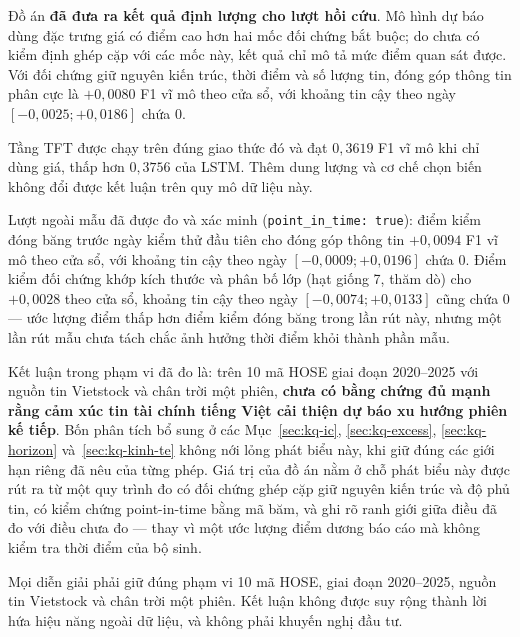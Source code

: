 Đồ án \textbf{đã đưa ra kết quả định lượng cho lượt hồi cứu}. Mô hình dự báo dùng đặc
trưng giá có điểm cao hơn hai mốc đối chứng bắt buộc; do chưa có kiểm định ghép cặp với
các mốc này, kết quả chỉ mô tả mức điểm quan sát được. Với đối chứng giữ nguyên kiến
trúc, thời điểm và số lượng tin, đóng góp thông tin phân cực là $+0{,}0080$ F1
vĩ mô theo cửa sổ, với khoảng tin cậy theo ngày $[-0{,}0025; +0{,}0186]$ chứa 0.

Tầng TFT được chạy trên đúng giao thức đó và đạt $0{,}3619$ F1 vĩ mô khi chỉ dùng giá,
thấp hơn $0{,}3756$ của LSTM. Thêm dung lượng và cơ chế chọn biến không đổi được kết
luận trên quy mô dữ liệu này.

Lượt ngoài mẫu đã được đo và xác minh (\texttt{point\_in\_time: true}): điểm
kiểm đóng băng trước ngày kiểm thử đầu tiên cho đóng góp thông tin $+0{,}0094$
F1 vĩ mô theo cửa sổ, với khoảng tin cậy theo ngày $[-0{,}0009; +0{,}0196]$ chứa
0. Điểm kiểm đối chứng khớp kích thước và phân bố lớp (hạt giống 7, thăm dò)
cho $+0{,}0028$ theo cửa sổ, khoảng tin cậy theo ngày $[-0{,}0074; +0{,}0133]$
cũng chứa 0 --- ước lượng điểm thấp hơn điểm kiểm đóng băng trong lần rút này,
nhưng một lần rút mẫu chưa tách chắc ảnh hưởng thời điểm khỏi thành phần mẫu.

Kết luận trong phạm vi đã đo là: trên 10 mã HOSE giai đoạn 2020--2025 với nguồn tin
Vietstock và chân trời một phiên, \textbf{chưa có bằng chứng đủ mạnh rằng cảm xúc
tin tài chính tiếng Việt cải thiện dự báo xu hướng phiên kế tiếp}. Bốn phân tích
bổ sung ở các Mục~\ref{sec:kq-ic}, \ref{sec:kq-excess}, \ref{sec:kq-horizon}
và~\ref{sec:kq-kinh-te} không nới lỏng phát biểu này, khi giữ đúng các giới hạn
riêng đã nêu của từng phép. Giá trị của đồ án nằm ở chỗ
phát biểu này được rút ra từ một quy trình đo có đối chứng ghép cặp giữ nguyên kiến
trúc và độ phủ tin, có kiểm chứng point-in-time bằng mã băm, và ghi rõ ranh giới
giữa điều đã đo với điều chưa đo --- thay vì một ước lượng điểm dương báo cáo mà
không kiểm tra thời điểm của bộ sinh.

Mọi diễn giải phải giữ đúng phạm vi 10 mã HOSE, giai đoạn 2020--2025, nguồn tin Vietstock và
chân trời một phiên. Kết luận không được suy rộng thành lời hứa hiệu năng ngoài dữ liệu, và
không phải khuyến nghị đầu tư.
